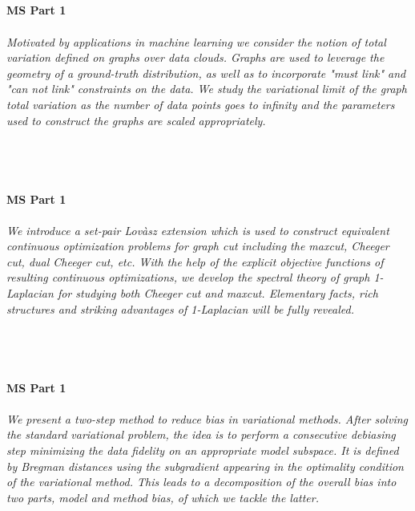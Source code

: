 \begin{multicols}{2}
\\ 
    \\
    \\\\
    \noindent\textbf{MS Part 1}\\
\\  
    \textit{Motivated by applications in machine learning we consider the notion of total variation defined on graphs over  data clouds. Graphs are used to leverage the geometry of a ground-truth distribution, as well as to incorporate "must link" and "can not link" constraints on the data. We study the variational limit of the graph total variation as the number of data points goes to infinity and the parameters used to construct the graphs are scaled appropriately.}\\
\\ 
    \\
    \\\\
    \noindent\textbf{MS Part 1}\\
\\  
    \textit{We introduce a set-pair Lovàsz extension which is used to construct equivalent continuous optimization problems for graph cut including the maxcut, Cheeger cut, dual Cheeger cut, etc. With the help of the explicit objective functions of resulting continuous optimizations, we develop the spectral theory of graph 1-Laplacian for studying both Cheeger cut and maxcut. Elementary facts, rich structures and striking advantages of 1-Laplacian will be fully revealed.}\\
\\ 
    \\
    \\\\
    \noindent\textbf{MS Part 1}\\
\\  
    \textit{We present a two-step method to reduce bias in variational methods. After solving the standard variational problem, the idea is to perform a consecutive debiasing step minimizing the data fidelity on an appropriate model subspace. It is defined by Bregman distances using the subgradient appearing in the optimality condition of the variational method. This leads to a decomposition of the overall bias into two parts, model and method bias, of which we tackle the latter.}\\

\end{multicols}

